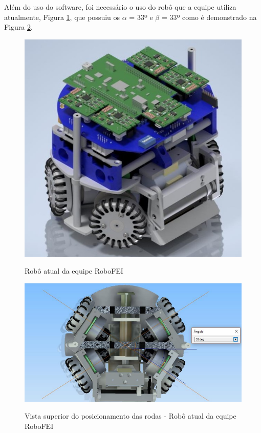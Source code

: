 \documentclass[deposito, acronym, symbols]{fei}
\begin{document}
Além do uso do software, foi necessário o uso do robô que a equipe utiliza atualmente, Figura \ref{fig:robo2012}, que possuiu os $\alpha$ = 33º e $\beta$ = 33º como é demonstrado na Figura \ref{fig:angulosantigos}. 

\begin{figure}[!htb]
    \centering
    \caption{Robô atual da equipe RoboFEI}
    \includegraphics[scale=0.50]{Imagens/Foto_Robo_2012.jpg}
    \label{fig:robo2012}
\end{figure}

\begin{figure}[!htb]
    \centering
    \caption{Vista superior do posicionamento das rodas - Robô atual da equipe RoboFEI}
    \includegraphics[scale=0.50]{Imagens/Angulos_robo_antigo.png}
    \label{fig:angulosantigos} 
\end{figure}
\end{document}
